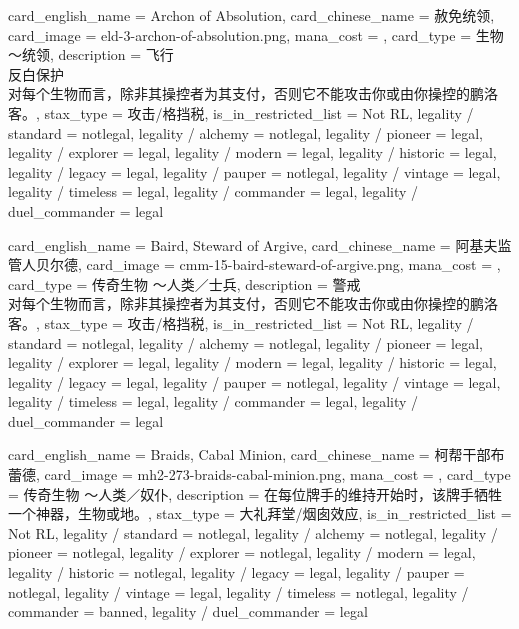 \documentclass[lang = cn, color = black, 10pt]{AllThatStax}
\begin{document}
\card
{
	card_english_name = {Archon of Absolution},
	card_chinese_name = {赦免统领},
	card_image = eld-3-archon-of-absolution.png,
	mana_cost = ,
	card_type = 生物 ～统领,
	description = {飞行\\
		反白保护\\
		对每个生物而言，除非其操控者为其支付，否则它不能攻击你或由你操控的鹏洛客。},
	stax_type = 攻击/格挡税,
	is_in_restricted_list = Not RL,
	legality / standard = notlegal,
	legality / alchemy = notlegal,
	legality / pioneer = legal,
	legality / explorer = legal,
	legality / modern = legal,
	legality / historic = legal,
	legality / legacy = legal,
	legality / pauper = notlegal,
	legality / vintage = legal,
	legality / timeless = legal,
	legality / commander = legal,
	legality / duel_commander = legal
}

\card
{
	card_english_name = {Baird, Steward of Argive},
	card_chinese_name = {阿基夫监管人贝尔德},
	card_image = cmm-15-baird-steward-of-argive.png,
	mana_cost = ,
	card_type = 传奇生物 ～人类／士兵,
	description = {警戒\\
		对每个生物而言，除非其操控者为其支付，否则它不能攻击你或由你操控的鹏洛客。},
	stax_type = 攻击/格挡税,
	is_in_restricted_list = Not RL,
	legality / standard = notlegal,
	legality / alchemy = notlegal,
	legality / pioneer = legal,
	legality / explorer = legal,
	legality / modern = legal,
	legality / historic = legal,
	legality / legacy = legal,
	legality / pauper = notlegal,
	legality / vintage = legal,
	legality / timeless = legal,
	legality / commander = legal,
	legality / duel_commander = legal
}

\card
{
	card_english_name = {Braids, Cabal Minion},
	card_chinese_name = {柯帮干部布蕾德},
	card_image = mh2-273-braids-cabal-minion.png,
	mana_cost = ,
	card_type = 传奇生物 ～人类／奴仆,
	description = {在每位牌手的维持开始时，该牌手牺牲一个神器，生物或地。},
	stax_type = 大礼拜堂/烟囱效应,
	is_in_restricted_list = Not RL,
	legality / standard = notlegal,
	legality / alchemy = notlegal,
	legality / pioneer = notlegal,
	legality / explorer = notlegal,
	legality / modern = legal,
	legality / historic = notlegal,
	legality / legacy = legal,
	legality / pauper = notlegal,
	legality / vintage = legal,
	legality / timeless = notlegal,
	legality / commander = banned,
	legality / duel_commander = legal
}
\end{document}

